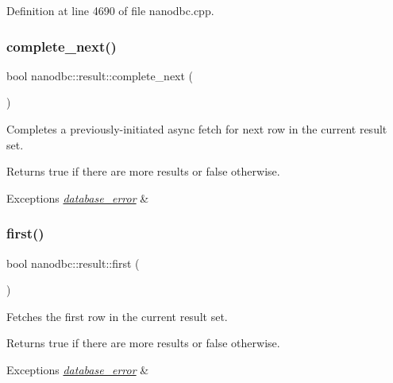 Definition at line 4690 of file nanodbc.\+cpp.

\mbox{\label{classnanodbc_1_1result_a0af2da5efc2576da4d2b2b54e340e11c}} 
\subsubsection{\texorpdfstring{complete\_next()}{complete\_next()}}
{\footnotesize\ttfamily bool nanodbc\+::result\+::complete\+\_\+next (\begin{DoxyParamCaption}{ }\end{DoxyParamCaption})}



Completes a previously-\/initiated async fetch for next row in the current result set. 

\begin{DoxyReturn}{Returns}
true if there are more results or false otherwise. 
\end{DoxyReturn}

\begin{DoxyExceptions}{Exceptions}
{\em \mbox{\hyperlink{classnanodbc_1_1database__error}{database\+\_\+error}}} & \\
\hline
\end{DoxyExceptions}
\mbox{\label{classnanodbc_1_1result_a8ce75f4ab1bb039c6ee6724966f54a93}} 
\subsubsection{\texorpdfstring{first()}{first()}}
{\footnotesize\ttfamily bool nanodbc\+::result\+::first (\begin{DoxyParamCaption}{ }\end{DoxyParamCaption})}



Fetches the first row in the current result set. 

\begin{DoxyReturn}{Returns}
true if there are more results or false otherwise. 
\end{DoxyReturn}

\begin{DoxyExceptions}{Exceptions}
{\em \mbox{\hyperlink{classnanodbc_1_1database__error}{database\+\_\+error}}} & \\
\hline
\end{DoxyExceptions}



